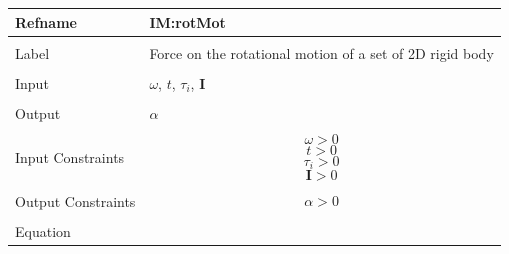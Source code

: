 \documentclass[12pt]{article}
\begin{document}
\noindent \begin{minipage}{\textwidth}
\begin{tabular}{p{} p{}}
\toprule \textbf{Refname} & \textbf{IM:rotMot}
\label{IM:rotMot}
\\ \midrule \\
Label & Force on the rotational motion of a set of 2D rigid body
        \\ \midrule \\
        Input & $ω$, $t$, ${τ_{i}}$, $\mathbf{I}$
                \\ \midrule \\
                Output & $α$
                         \\ \midrule \\
                         Input Constraints & \begin{displaymath}
                                             ω>0
                                             \end{displaymath}
                                             \begin{displaymath}
                                             t>0
                                             \end{displaymath}
                                             \begin{displaymath}
                                             {τ_{i}}>0
                                             \end{displaymath}
                                             \begin{displaymath}
                                             \mathbf{I}>0
                                             \end{displaymath}
                                             \\ \midrule \\
                                             Output Constraints & \begin{displaymath}
                                                                  α>0
                                                                  \end{displaymath}
                                                                  \\ \midrule \\
                                                                  Equation & \begin{displaymath}

\end{displaymath}
\end{tabular}
\end{minipage}
\end{document}
